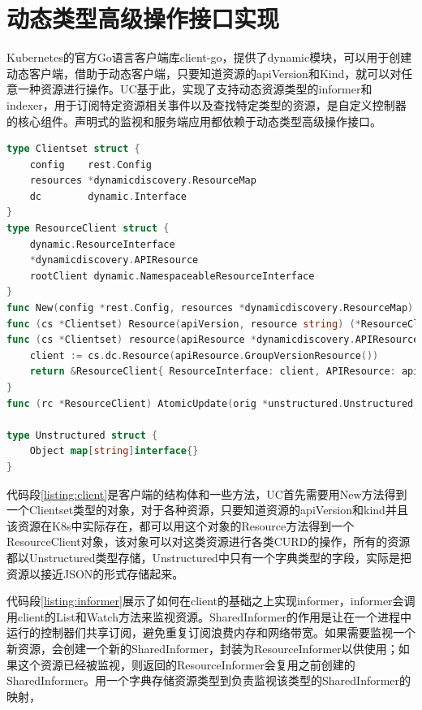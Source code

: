 \documentclass[macfonts,master]{njuthesis}
\begin{document}
\section{动态类型高级操作接口实现}

Kubernetes的官方Go语言客户端库client-go，提供了dynamic模块，可以用于创建动态客户端，借助于动态客户端，只要知道资源的apiVersion和Kind，就可以对任意一种资源进行操作。UC基于此，实现了支持动态资源类型的informer和indexer，用于订阅特定资源相关事件以及查找特定类型的资源，是自定义控制器的核心组件。声明式的监视和服务端应用都依赖于动态类型高级操作接口。


\begin{lstlisting}[language=Go,caption=客户端实现,label=listing:client]
type Clientset struct {
	config    rest.Config
	resources *dynamicdiscovery.ResourceMap
	dc        dynamic.Interface
}
type ResourceClient struct {
	dynamic.ResourceInterface
	*dynamicdiscovery.APIResource
	rootClient dynamic.NamespaceableResourceInterface
}
func New(config *rest.Config, resources *dynamicdiscovery.ResourceMap) (*Clientset, error)
func (cs *Clientset) Resource(apiVersion, resource string) (*ResourceClient, error)
func (cs *Clientset) resource(apiResource *dynamicdiscovery.APIResource) *ResourceClient {
	client := cs.dc.Resource(apiResource.GroupVersionResource())
	return &ResourceClient{ ResourceInterface: client, APIResource: apiResource, rootClient: client, }
}
func (rc *ResourceClient) AtomicUpdate(orig *unstructured.Unstructured, update func(obj *unstructured.Unstructured) bool) (result *unstructured.Unstructured, err error)

type Unstructured struct {
	Object map[string]interface{}
}
\end{lstlisting}

代码段\ref{listing:client}是客户端的结构体和一些方法，UC首先需要用New方法得到一个Clientset类型的对象，对于各种资源，只要知道资源的apiVersion和kind并且该资源在K8s中实际存在，都可以用这个对象的Resource方法得到一个ResourceClient对象，该对象可以对这类资源进行各类CURD的操作，所有的资源都以Unstructured类型存储，Unstructured中只有一个字典类型的字段，实际是把资源以接近JSON的形式存储起来。

代码段\ref{listing:informer}展示了如何在client的基础之上实现informer，informer会调用client的List和Watch方法来监视资源。SharedInformer的作用是让在一个进程中运行的控制器们共享订阅，避免重复订阅浪费内存和网络带宽。如果需要监视一个新资源，会创建一个新的SharedInformer，封装为ResourceInformer以供使用；如果这个资源已经被监视，则返回的ResourceInformer会复用之前创建的SharedInformer。用一个字典存储资源类型到负责监视该类型的SharedInformer的映射，
\end{document}
